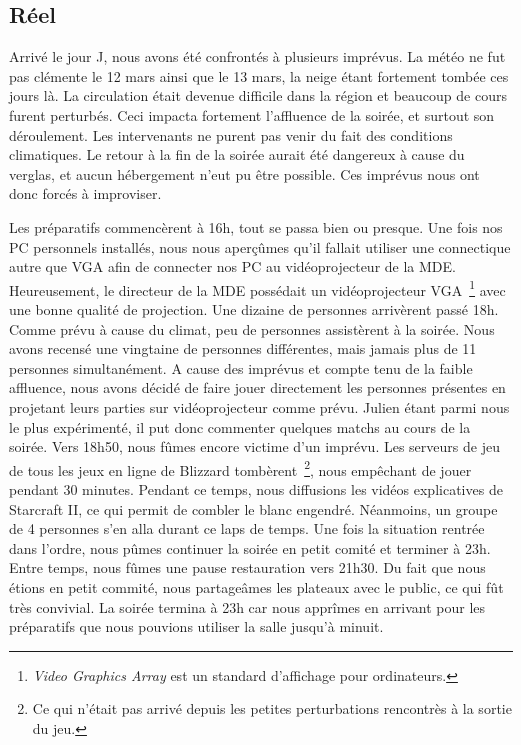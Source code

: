 \subsection{Réel}%
\label{sub:reel}

Arrivé le jour J, nous avons été confrontés à plusieurs imprévus.
La météo ne fut pas clémente le 12 mars ainsi que le 13 mars, la neige étant fortement
tombée ces jours là. La circulation était devenue difficile dans la région et beaucoup de cours
furent perturbés.
Ceci impacta fortement l’affluence de la soirée, et surtout son déroulement. Les intervenants
ne purent pas venir du fait des conditions climatiques. Le retour à la fin de la soirée aurait été
dangereux à cause du verglas, et aucun hébergement n’eut pu être possible.
Ces imprévus nous ont donc forcés à improviser.

Les préparatifs commencèrent à 16h, tout se passa bien ou presque. Une fois nos PC personnels
installés, nous nous aperçûmes qu’il fallait utiliser une connectique autre que VGA afin de
connecter nos PC au vidéoprojecteur de la MDE. Heureusement, le
directeur de la MDE 
possédait un vidéoprojecteur VGA\, \footnote{\emph{Video Graphics
Array} est un standard d'affichage pour ordinateurs.} avec une bonne qualité de projection.
Une dizaine de personnes arrivèrent passé 18h. Comme prévu à cause du climat, peu de
personnes assistèrent à la soirée. Nous avons recensé une vingtaine de personnes
différentes, mais jamais plus de 11 personnes simultanément.
A cause des imprévus et compte tenu de la faible affluence, nous avons décidé de faire jouer
directement les personnes présentes en projetant leurs parties sur vidéoprojecteur comme
prévu. Julien étant parmi nous le plus expérimenté, il put donc commenter quelques matchs
au cours de la soirée.
Vers 18h50, nous fûmes encore victime d’un imprévu. Les serveurs de jeu de tous les jeux en
ligne de Blizzard tombèrent\, \footnote{Ce qui n'était pas arrivé depuis
les petites perturbations rencontrès à la sortie du jeu.}, nous empêchant de jouer pendant 30 minutes. Pendant ce
temps, nous diffusions les vidéos explicatives de Starcraft II, ce qui permit de combler le
blanc engendré. Néanmoins, un groupe de 4 personnes s’en alla durant ce laps de temps.
Une fois la situation rentrée dans l’ordre, nous pûmes continuer la soirée en petit comité et
terminer à 23h. Entre temps, nous fûmes une pause restauration vers
21h30. Du fait que nous étions en petit commité, nous
partageâmes les plateaux avec le public, ce qui fût très
convivial. La soirée termina à 23h car nous apprîmes en arrivant pour les préparatifs
que nous pouvions utiliser la salle jusqu’à minuit.

